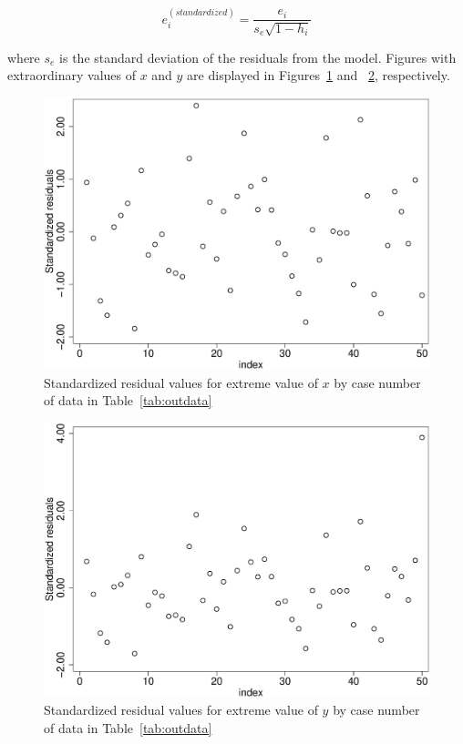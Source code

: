\begin{equation}
e^{\left(standardized\right)}_i=\frac{e_i}{s_e\sqrt{1-h_i}}
\end{equation}

where $s_e$ is the standard deviation of the residuals from the model. Figures with extraordinary values of $x$ and $y$ are displayed in Figures~\ref{fig:xstandard} and ~\ref{fig:ystandard}, respectively.

\begin{figure}
   \centering
   \includegraphics[angle=0,
           width=.75\textwidth]{xout_standard_index.eps}
   \caption{Standardized residual values for extreme value of $x$ by case number of data in Table~\ref{tab:outdata}}
  \label{fig:xstandard}
\end{figure}

\begin{figure}
   \centering
   \includegraphics[angle=0,
           width=.75\textwidth]{yout_standard_index.eps}
   \caption{Standardized residual values for extreme value of $y$ by case number of data in Table~\ref{tab:outdata}}
  \label{fig:ystandard}
\end{figure}

